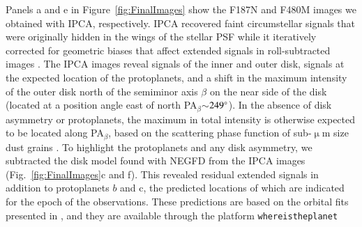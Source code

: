 \documentclass[longauth]{aa}
\begin{document}
Panels a and e in Figure~\ref{fig:FinalImages} show the F187N and F480M images we obtained with IPCA, respectively. IPCA recovered faint circumstellar signals that were originally hidden in the wings of the stellar PSF while it iteratively corrected for geometric biases that affect extended signals in roll-subtracted images \citep[Fig.~\ref{fig:AltAlgos}a and e; 
    ][]{Juillard2022}. 
The IPCA images %
reveal signals of the inner and outer disk, signals at the expected location of the protoplanets, and a shift in the maximum intensity of the outer disk north of the semiminor axis $\beta$ on the near side of the disk (located at a position angle east of north PA$_{\beta}$$\sim$$249^\circ$). In the absence of disk asymmetry or protoplanets, the maximum in total intensity is otherwise expected to be located along PA$_{\beta}$, based on the scattering phase function of sub-$\upmu$m size dust grains \citep[e.g.,][]{Milli2017}.
To %
highlight %
the protoplanets and any disk asymmetry, we subtracted the %
disk model found with NEGFD from the IPCA images (Fig.~\ref{fig:FinalImages}c and f). This revealed residual extended signals in addition to protoplanets $b$ and c, the predicted locations of which are indicated for the epoch of the observations. These predictions are based on the orbital fits presented in \citet{Wang2021}, and they are available through the platform \texttt{whereistheplanet} %
\end{document}
